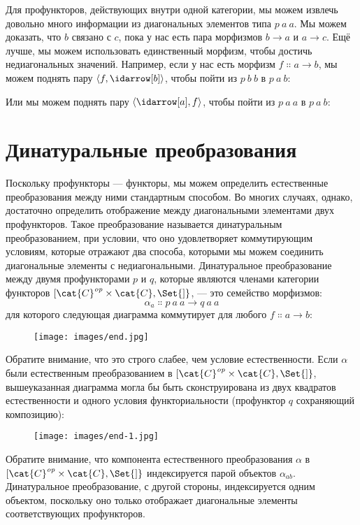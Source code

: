 Для профункторов, действующих внутри одной категории, мы можем извлечь довольно много
информации из диагональных элементов типа $p\ a\ a$. Мы
можем доказать, что $b$ связано с $c$, пока у нас есть
пара морфизмов $b \to a$ и
$a \to c$. Ещё лучше, мы можем использовать единственный морфизм, чтобы
достичь недиагональных значений. Например, если у нас есть морфизм
$f \Colon a \to b$, мы можем поднять пару
$\langle f, \idarrow[b] \rangle$, чтобы пойти из $p\ b\ b$ в
$p\ a\ b$:

Или мы можем поднять пару $\langle \idarrow[a], f \rangle$, чтобы пойти
из $p\ a\ a$ в $p\ a\ b$:


\section{Динатуральные преобразования}

Поскольку профункторы --- функторы, мы можем определить естественные преобразования
между ними стандартным способом. Во многих случаях, однако, достаточно
определить отображение между диагональными элементами двух профункторов. Такое
преобразование называется динатуральным преобразованием, при условии, что оно
удовлетворяет коммутирующим условиям, которые отражают два способа, которыми мы можем
соединить диагональные элементы с недиагональными. Динатуральное
преобразование между двумя профункторами $p$ и $q$, которые
являются членами категории функторов ${[}\cat{C}^\mathit{op}\times{}\cat{C}, \Set{]}$, --- это
семейство морфизмов:
\[\alpha_a \Colon p\ a\ a \to q\ a\ a\]
для которого следующая диаграмма коммутирует для любого $f \Colon a \to b$:

\begin{figure}[H]
  \centering
  \texttt{[image: images/end.jpg]}
\end{figure}

\noindent
Обратите внимание, что это строго слабее, чем условие естественности. Если
$\alpha$ были естественным преобразованием в
${[}\cat{C}^\mathit{op}\times{}\cat{C}, \Set{]}$, вышеуказанная диаграмма могла бы быть сконструирована
из двух квадратов естественности и одного условия функториальности (профунктор
$q$ сохраняющий композицию):

\begin{figure}[H]
  \centering
  \texttt{[image: images/end-1.jpg]}
\end{figure}

\noindent
Обратите внимание, что компонента естественного преобразования $\alpha$ в
${[}\cat{C}^\mathit{op}\times{}\cat{C}, \Set{]}$ индексируется парой объектов
$\alpha_{a b}$. Динатуральное преобразование, с другой стороны,
индексируется одним объектом, поскольку оно только отображает диагональные элементы
соответствующих профункторов.

